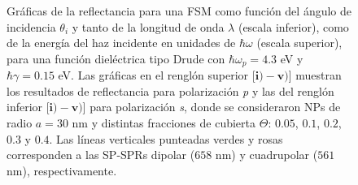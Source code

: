 	\begin{figure}[h!]\centering
	\vspace*{-.5em}
	\caption{Gráficas de la reflectancia para una FSM como función del ángulo de incidencia $\theta_i$ y tanto de la longitud de onda $\lambda$ (escala inferior), como de la energía del haz incidente en unidades de $\hbar\omega$ (escala superior), para una función dieléctrica tipo Drude con $\hbar\omega_p=4. 3$ eV  y  $\hbar\gamma=0. 15$ eV.  Las gráficas   en el renglón superior [$\mathbf{i)-v)}$]  muestran los resultados de reflectancia para  polarización \emph{p} y las del renglón inferior  [$\mathbf{i)-v)}$] para polarización  \emph{s}, donde se consideraron NPs de radio $a=30$ nm y distintas fracciones de cubierta $\Theta$: $0. 05$, $0. 1$, $0. 2$, $0. 3$ y $0. 4$. Las líneas verticales punteadas verdes y rosas corresponden a las SP-SPRs dipolar ($658$ nm) y cuadrupolar ($561$ nm), respectivamente.}	\label{fig:R-FSM}	
	\end{figure}		
					
